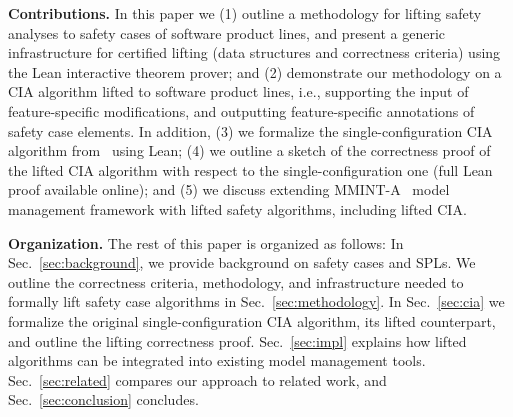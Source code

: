 \vskip 0.05in
\noindent
{\bf Contributions.}
In this paper we
(1) outline a methodology for lifting safety analyses to safety cases of software product lines, and present a generic infrastructure for certified lifting (data structures and correctness criteria) using the Lean interactive theorem prover; and
(2) demonstrate our methodology on a CIA algorithm lifted to software product lines, i.e., supporting the input of feature-specific modifications, and outputting feature-specific annotations of safety case elements. In addition,
(3) we formalize the single-configuration CIA algorithm from~\cite{Kokaly:2017} using Lean;
(4) we outline a sketch of the correctness proof of the lifted CIA algorithm with respect to the single-configuration one (full Lean proof available online); and
(5) we discuss extending MMINT-A~\cite{Fung:2018} model management framework with lifted safety algorithms, including lifted CIA.

\vskip 0.05in
\noindent
{\bf Organization.}
The rest of this paper is organized as follows:
In Sec.~\ref{sec:background}, we provide background on safety cases and SPLs. 
We outline the correctness criteria, methodology, and infrastructure needed to formally lift safety case algorithms in Sec.~\ref{sec:methodology}.
In Sec.~\ref{sec:cia} we formalize the original single-configuration CIA algorithm, its lifted counterpart, and outline the lifting correctness proof.
Sec.~\ref{sec:impl} explains how lifted algorithms can be integrated into existing model management tools.  Sec.~\ref{sec:related} compares our approach to related work, and Sec.~\ref{sec:conclusion} concludes.
